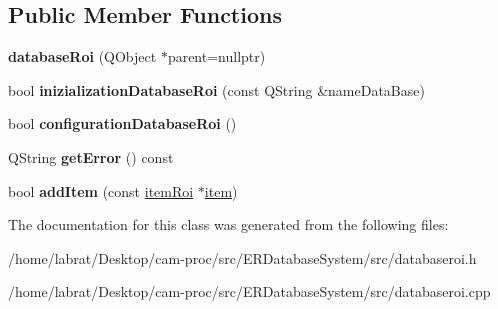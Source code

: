 \subsection*{Public Member Functions}
\begin{DoxyCompactItemize}
\item 
{\bfseries database\+Roi} (Q\+Object $\ast$parent=nullptr)\hypertarget{classdatabaseRoi_a72439aded96c23105d78bb9461d3c60b}{}\label{classdatabaseRoi_a72439aded96c23105d78bb9461d3c60b}

\item 
bool {\bfseries inizialization\+Database\+Roi} (const Q\+String \&name\+Data\+Base)\hypertarget{classdatabaseRoi_a68f89be2b5aedfe17a5a0b7553f976f3}{}\label{classdatabaseRoi_a68f89be2b5aedfe17a5a0b7553f976f3}

\item 
bool {\bfseries configuration\+Database\+Roi} ()\hypertarget{classdatabaseRoi_a5a8aa4df2cae5ae3b8e7cfb863014d78}{}\label{classdatabaseRoi_a5a8aa4df2cae5ae3b8e7cfb863014d78}

\item 
Q\+String {\bfseries get\+Error} () const \hypertarget{classdatabaseRoi_a37fd6d6c60daca94cc9b4233ddcff017}{}\label{classdatabaseRoi_a37fd6d6c60daca94cc9b4233ddcff017}

\item 
bool {\bfseries add\+Item} (const \hyperlink{classitemRoi}{item\+Roi} $\ast$\hyperlink{classitem}{item})\hypertarget{classdatabaseRoi_a3746a6ef5f1d230d6c5a37a1f57df969}{}\label{classdatabaseRoi_a3746a6ef5f1d230d6c5a37a1f57df969}

\end{DoxyCompactItemize}


The documentation for this class was generated from the following files\+:\begin{DoxyCompactItemize}
\item 
/home/labrat/\+Desktop/cam-\/proc/src/\+E\+R\+Database\+System/src/databaseroi.\+h\item 
/home/labrat/\+Desktop/cam-\/proc/src/\+E\+R\+Database\+System/src/databaseroi.\+cpp\end{DoxyCompactItemize}
